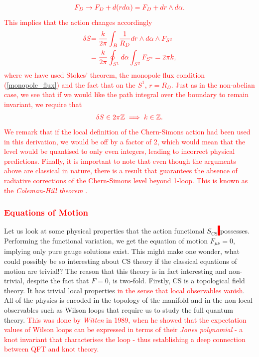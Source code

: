 \begin{align}
    \textcolor{red}{F_D \rightarrow F_D + d (r d\alpha) =F_D + dr \wedge d\alpha.}
\end{align}
 \textcolor{red}{This implies that the action changes accordingly }
\begin{align}
    \textcolor{red}{\delta S }& \textcolor{red}{= \frac{k}{2\pi} \int_B \frac{1}{R_D} dr \wedge d\alpha \wedge F_{S^2}}\\
    & \textcolor{red}{= \frac{k}{2\pi} \oint_{S^1}  d\alpha \int_{S^2} F_{S^2}=2\pi k,}
\end{align}
 \textcolor{red}{where we have used Stokes' theorem, the monopole flux condition (\ref{monopole_flux}) and the fact that on the $S^1$, $r=R_D$. Just as in the non-abelian case, we see that if we would like the path integral over the boundary to remain invariant, we require that }
\begin{align}
    \textcolor{red}{\delta S \in 2\pi \mathbb{Z} \implies k\in \mathbb{Z}.}
\end{align}
\textcolor{red}{We remark that if the local definition of the Chern-Simons action had been used in this derivation, we would be off by a factor of 2, which would mean that the level would be quanti\textcolor{red}{s}ed to only even integers, leading to incorrect physical predictions. Finally, it is important to note that even though the arguments above are classical in nature, there is a result that guarantees the absence of radiative corrections of the Chern-Simons level beyond 1-loop. This is known as the \textit{Coleman-Hill theorem} \cite{Coleman:1985zi, Khare:1994yv}.  }
 \textcolor{red}{\subsubsection*{Equations of Motion}}
    Let us look at some physical properties that the action functional $S_{\text{CS}}$\colorbox{red}{ } possesses. Performing the functional variation, we get the equation of motion $F_{\mu \nu}=0$, implying only pure gauge solutions exist. This might make one wonder, what could possibly be so interesting about CS theory if the classical equations of motion are trivial!?
    The reason that this theory is in fact interesting and non-trivial, despite the fact that $F=0$, is two-fold. Firstly, CS is a topological field theory. It has trivial local properties \textcolor{red}{in the sense that local observables vanish}. All of the physics is encoded in the topology of the manifold and in the non-local observables such as Wilson loops that require us to study the full quantum theory. \textcolor{red}{This was done by \textit{Witten} \cite{Witten1989} in 1989, when he showed that the expectation values of Wilson loops can be expressed in terms of their \textit{Jones polynomial} - a knot invariant that characterises the loop - thus establishing a deep connection between QFT and knot theory.}

